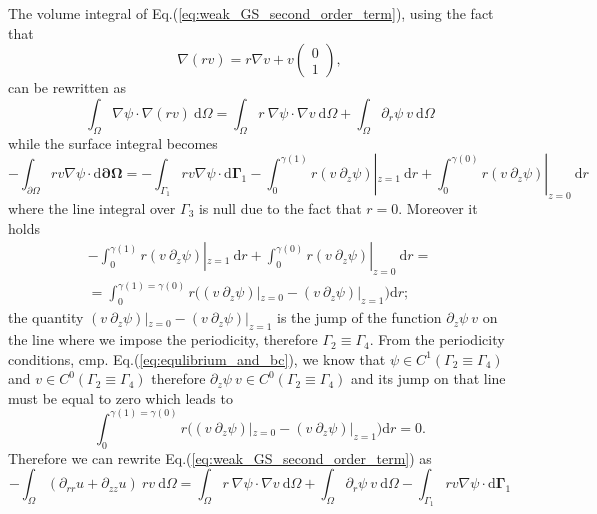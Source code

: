The volume integral of Eq.(\ref{eq:weak_GS_second_order_term}), using the fact that
\begin{equation}
  \nabla(rv)=r\nabla v+v\left(\begin{array}{c}0\\1\end{array}\right),
\end{equation}
can be rewritten as
\begin{equation}
  \int_\Omega\nabla\psi \cdot\nabla(rv)\:\mathrm{d}\Omega=\int_\Omega r\:\nabla\psi \cdot\nabla v\:\mathrm{d}\Omega+\int_{\Omega}\partial_r\psi\:v\:\mathrm{d}\Omega
\end{equation}
while the surface integral becomes
\begin{equation}
  -\int_{\partial\Omega} rv\nabla \psi\cdot\mathrm{d}\mathbf{\partial\mathbf{\Omega}} = -\int_{\Gamma_1} rv\nabla \psi\cdot\mathrm{d}\mathbf{\Gamma}_1 - \int_0^{\gamma(1)}r(v\:\partial_z\psi)|_{z=1}\:\mathrm{d}r + \int_0^{\gamma(0)}r(v\:\partial_z\psi)|_{z=0}\:\mathrm{d}r
\end{equation}
where the line integral over $\Gamma_3$ is null due to the fact that $r=0$. Moreover it holds
\begin{equation}
  \begin{split}
    -\int_0^{\gamma(1)}r(v\:\partial_z\psi)|_{z=1}\:\mathrm{d}r + \int_0^{\gamma(0)}r(v\:\partial_z\psi)|_{z=0}\:\mathrm{d}r=\\
  =\int_0^{\gamma(1)=\gamma(0)}r\big((v\:\partial_z\psi)|_{z=0}-(v\:\partial_z\psi)|_{z=1}\big)\mathrm{d}r;
  \end{split}
\end{equation}
the quantity $(v\:\partial_z\psi)|_{z=0}-(v\:\partial_z\psi)|_{z=1}$ is the jump of the function $\partial_z\psi \:v$ on the line where we impose the periodicity, therefore $\Gamma_2\equiv\Gamma_4$. From the periodicity conditions, cmp. Eq.(\ref{eq:equlibrium_and_bc}), we know that $\psi\in C^1(\Gamma_2\equiv\Gamma_4)$ and $v\in C^0(\Gamma_2\equiv\Gamma_4)$ therefore $\partial_z\psi\:v\in C^0(\Gamma_2\equiv\Gamma_4)$ and its jump on that line must be equal to zero which leads to
\begin{equation}
  \int_0^{\gamma(1)=\gamma(0)}r\big((v\:\partial_z\psi)|_{z=0}-(v\:\partial_z\psi)|_{z=1}\big)\mathrm{d}r=0.
\end{equation}
Therefore we can rewrite Eq.(\ref{eq:weak_GS_second_order_term}) as
\begin{equation}
  -\int_{\Omega}(\partial_{rr}u+\partial_{zz}u)\:rv\:\mathrm{d}\Omega=\int_\Omega r\:\nabla\psi \cdot\nabla v\:\mathrm{d}\Omega+\int_{\Omega}\partial_r\psi\:v\:\mathrm{d}\Omega-\int_{\Gamma_1} rv\nabla \psi\cdot\mathrm{d}\mathbf{\Gamma}_1
\end{equation}
